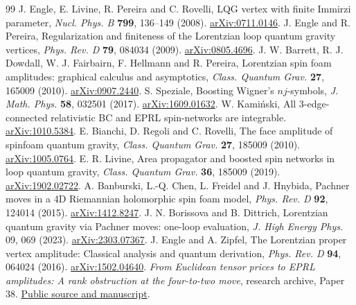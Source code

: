 \documentclass[11pt]{article}
\theoremstyle{remark}
\begin{document}
\begin{thebibliography}{99}
 J. Engle, E. Livine, R. Pereira and C. Rovelli,
  LQG vertex with finite Immirzi parameter, \emph{Nucl. Phys. B} \textbf{799}, 136--149 (2008).
  \href{https://arxiv.org/abs/0711.0146}{arXiv:0711.0146}.
 J. Engle and R. Pereira,
  Regularization and finiteness of the Lorentzian loop quantum gravity vertices, \emph{Phys. Rev. D} \textbf{79}, 084034 (2009).
  \href{https://arxiv.org/abs/0805.4696}{arXiv:0805.4696}.
 J. W. Barrett, R. J. Dowdall, W. J. Fairbairn, F. Hellmann and R. Pereira,
  Lorentzian spin foam amplitudes: graphical calculus and asymptotics, \emph{Class. Quantum Grav.} \textbf{27}, 165009 (2010).
  \href{https://arxiv.org/abs/0907.2440}{arXiv:0907.2440}.
 S. Speziale,
  Boosting Wigner's \(nj\)-symbols, \emph{J. Math. Phys.} \textbf{58}, 032501 (2017).
  \href{https://arxiv.org/abs/1609.01632}{arXiv:1609.01632}.
 W. Kami\'nski,
  All 3-edge-connected relativistic BC and EPRL spin-networks are integrable.
  \href{https://arxiv.org/abs/1010.5384}{arXiv:1010.5384}.
 E. Bianchi, D. Regoli and C. Rovelli,
  The face amplitude of spinfoam quantum gravity, \emph{Class. Quantum Grav.} \textbf{27}, 185009 (2010).
  \href{https://arxiv.org/abs/1005.0764}{arXiv:1005.0764}.
 E. R. Livine, Area propagator and boosted spin networks in loop quantum gravity,
  \emph{Class. Quantum Grav.} \textbf{36}, 185009 (2019).
  \href{https://arxiv.org/abs/1902.02722}{arXiv:1902.02722}.
 A. Banburski, L.-Q. Chen, L. Freidel and J. Hnybida,
  Pachner moves in a 4D Riemannian holomorphic spin foam model, \emph{Phys. Rev. D} \textbf{92}, 124014 (2015).
  \href{https://arxiv.org/abs/1412.8247}{arXiv:1412.8247}.
 J. N. Borissova and B. Dittrich, Lorentzian quantum gravity via Pachner moves: one-loop evaluation,
  \emph{J. High Energy Phys.} 09, 069 (2023).
  \href{https://arxiv.org/abs/2303.07367}{arXiv:2303.07367}.
 J. Engle and A. Zipfel, The Lorentzian proper vertex amplitude: Classical analysis and quantum derivation,
  \emph{Phys. Rev. D} \textbf{94}, 064024 (2016).
  \href{https://arxiv.org/abs/1502.04640}{arXiv:1502.04640}.
 \emph{From Euclidean tensor prices to EPRL amplitudes: A rank obstruction at the four-to-two move}, research archive, Paper 38.
  \href{https://github.com/g3173028019-beep/ai-automated-quantum-gravity-research/tree/main/papers/38-tensor-prices-eprl-boundary}{Public source and manuscript}.
\end{thebibliography}
\end{document}
